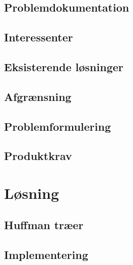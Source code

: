 \documentclass[12pt,a4paper]{report}
\begin{document}
	\section{Problemdokumentation}
	
	
	\section{Interessenter}
	

	\section{Eksisterende løsninger}
	

	\section{Afgrænsning}
	

	\section{Problemformulering}
		
	
	\section{Produktkrav}
	
	



\chapter{Løsning}

  

	\section{Huffman træer}
	\label{huffman_traer}
	

	\section{Implementering}
	
\end{document}
